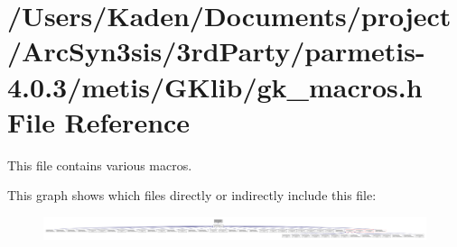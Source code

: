 \hypertarget{a00053}{}\section{/\+Users/\+Kaden/\+Documents/project/\+Arc\+Syn3sis/3rd\+Party/parmetis-\/4.0.3/metis/\+G\+Klib/gk\+\_\+macros.h File Reference}
\label{a00053}


This file contains various macros.  


This graph shows which files directly or indirectly include this file\+:\nopagebreak
\begin{figure}[H]
\begin{center}
\leavevmode
\includegraphics[width=350pt]{a00055}
\end{center}
\end{figure}
